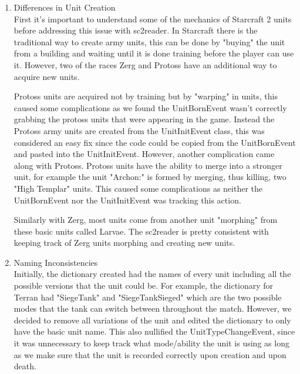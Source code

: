 \documentclass[a4paper,12pt]{report}
\begin{document}
\begin{enumerate}
\item Differences in Unit Creation \\
First it’s important to understand some of the mechanics of Starcraft 2 units before addressing this issue with sc2reader. In Starcraft there is the traditional way to create army units, this can be done by "buying" the unit from a building and waiting until it is done training before the player can use it. However, two of the races Zerg and Protoss have an additional way to acquire new units. 

Protoss units are acquired not by training but by "warping" in units, this caused some complications as we found the UnitBornEvent wasn’t correctly grabbing the protoss units that were appearing in the game. Instead the Protoss army units are created from the UnitInitEvent class, this was considered an easy fix since the code could be copied from the UnitBornEvent and pasted into the UnitInitEvent. However, another complication came along with Protoss. Protoss units have the ability to merge into a stronger unit, for example the unit "Archon:" is formed by merging, thus killing, two "High Templar" units. This caused some complications as neither the UnitBornEvent nor the UnitInitEvent was tracking this action.

Similarly with Zerg, most units come from another unit "morphing" from these basic units called Larvae. The sc2reader is pretty consistent with keeping track of Zerg units morphing and creating new units.

\item Naming Inconsistencies \\
Initially, the dictionary created had the names of every unit including all the possible versions that the unit could be. For example, the dictionary for Terran had "SiegeTank" and "SiegeTankSieged" which are the two possible modes that the tank can switch between throughout the match. However, we decided to remove all variations of the unit and edited the dictionary to only have the basic unit name. This also nullified the UnitTypeChangeEvent, since it was unnecessary to keep track what mode/ability the unit is using as long as we make sure that the unit is recorded correctly upon creation and upon death.


\end{enumerate}
\end{document}
